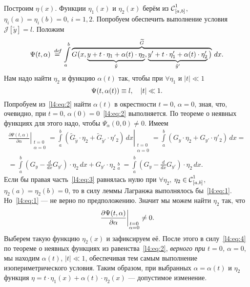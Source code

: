 \documentclass[12pt,a4paper,openany,fleqn]{book}
\newcommand {\defeq}{\stackrel{\hspace{0.09 cm}de\!f}{=}}
\newcommand {\eqdef}{\defeq}
\newcommand{\Cf}{\ensuremath{\mathcal{C}}}
\newcommand{\J}{\ensuremath{\mathcal{J}}}
\newcommand{\Cfn}[2][]{\ensuremath{\Cf{\mathstrut}^{#2}_{#1}}}
\newcommand{\der}[2]{\ensuremath{\frac{d#1}{d#2}}}
\newcommand{\pder}[2]{\ensuremath{\frac{\partial#1}{\partial#2}}}
\theoremstyle{definition}
\begin{document}
	Построим $\eta(x)$. Функции $\eta_1(x)$ и $\eta_2(x)$ берём из $\Cfn[{[a,b]}]{1}$, $\eta_i(a)=\eta_i(b)=0$, $i=1,2$. Попробуем обеспечить выполнение условия $\J[\tilde{y}]=l$. Положим
	\begin{equation*}
		\hfill\Psi(t,\alpha)\eqdef\int\limits_a^b \overbrace{G\big(x,\underbrace{y+t\cdot\eta_1+\alpha(t)\cdot\eta_2}_{\tilde{y}},\underbrace{y'+t\cdot\eta'_1+\alpha(t)\cdot\eta'_2}_{\tilde{y}'}\big)}^{\widetilde{G}}\,dx.\hfill
	\end{equation*}
Нам надо найти $\eta_2$ и функцию $\alpha(t)$ так, чтобы при $\forall\eta_1$ и $|t|\ll1$
\begin{equation}
	\label{l4:eq:2}
	\hfill\Psi(t,\alpha(t))\equiv l,\quad|t|\ll1.\hfill
\end{equation}
Попробуем из~\eqref{l4:eq:2} найти $\alpha(t)$ в окрестности $t=0$, $\alpha=0$, зная, что, очевидно, при $t=0$, ${\alpha(0)=0}$~\eqref{l4:eq:2} выполняется. По теореме о неявных функциях для этого надо, чтобы $\Psi_{\alpha}(0,0)\neq0$. Имеем
\begin{multline}
	\label{l4:eq:3}
	\left.\pder{\Psi(t,\alpha)}{\alpha}\right|_{\substack{t=0\\\alpha=0}}=\left.\int\limits_a^b\left(\widetilde{G}_{\tilde{y}}\cdot\eta_2+\widetilde{G}_{\tilde{y}'}\cdot\eta'_2\right)\,dx\right|_{\substack{t=0\\\alpha=0}}=\int\limits_a^b\left({G}_{{y}}\cdot\eta_2+{G}_{y'}\cdot\eta'_2\right)\,dx=\\
	=\int\limits_a^b\left(G_y-\der{}{x}G_{y'}\right)\cdot\eta_2\,dx+G_{y'}\cdot\eta_2\mathop{\Big|}\limits_a^b=\int\limits_a^b\left(G_y-\der{}{x}G_{y'}\right)\cdot\eta_2\,dx.
\end{multline}
Если бы правая часть~\eqref{l4:eq:3} равнялась нулю при $\forall\eta_2$, $\eta_2\in\Cfn[{[a,b]}]{1}$, $\eta_2(a)=\eta_2(b)=0$, то в силу леммы Лагранжа выполнялось бы~\eqref{l4:eq:1}. Но~\eqref{l4:eq:1} --- не верно по предположению. Значит мы можем найти $\eta_2$ так, что
\begin{equation}
	\label{l4:eq:4}
	\hfill\left.\pder{\Psi(t,\alpha)}{\alpha}\right|_{\substack{t=0\\\alpha=0}}\neq0.\hfill
\end{equation}
Выберем такую функцию $\eta_2(x)$ и зафиксируем её. После этого в силу~\eqref{l4:eq:4} по теореме о неявных функциях из равенства~\eqref{l4:eq:2}, \emph{верного при  $t=0$, $\alpha=0$}, мы находим $\alpha(t)$, $|t|\ll1$, обеспечивая тем самым выполнение изопериметрического условия. Таким образом, при выбранных $\alpha=\alpha(t)$ и $\eta_2$ функция $\eta=t\cdot\eta_1(x)+\alpha(t)\cdot\eta_2(x)$ --- допустимое изменение.
\end{document}
